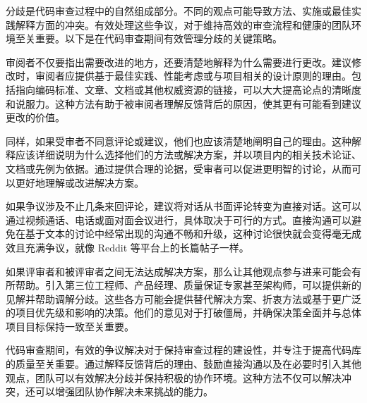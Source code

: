 
分歧是代码审查过程中的自然组成部分。不同的观点可能导致方法、实施或最佳实践解释方面的冲突。有效处理这些争议，对于维持高效的审查流程和健康的团队环境至关重要。以下是在代码审查期间有效管理分歧的关键策略。


审阅者不仅要指出需要改进的地方，还要清楚地解释为什么需要进行更改。建议修改时，审阅者应提供基于最佳实践、性能考虑或与项目相关的设计原则的理由。包括指向编码标准、文章、文档或其他权威资源的链接，可以大大提高论点的清晰度和说服力。这种方法有助于被审阅者理解反馈背后的原因，使其更有可能看到建议更改的价值。


同样，如果受审者不同意评论或建议，他们也应该清楚地阐明自己的理由。这种解释应该详细说明为什么选择他们的方法或解决方案，并以项目内的相关技术论证、文档或先例为依据。通过提供合理的论据，受审者可以促进更明智的讨论，从而可以更好地理解或改进解决方案。


如果争议涉及不止几条来回评论，建议将对话从书面评论转变为直接对话。这可以通过视频通话、电话或面对面会议进行，具体取决于可行的方式。直接沟通可以避免在基于文本的讨论中经常出现的沟通不畅和升级，这种讨论很快就会变得毫无成效且充满争议，就像 Reddit 等平台上的长篇帖子一样。


如果评审者和被评审者之间无法达成解决方案，那么让其他观点参与进来可能会有所帮助。引入第三位工程师、产品经理、质量保证专家甚至架构师，可以提供新的见解并帮助调解分歧。这些各方可能会提供替代解决方案、折衷方法或基于更广泛的项目优先级和影响的决策。他们的意见对于打破僵局，并确保决策全面并与总体项目目标保持一致至关重要。

代码审查期间，有效的争议解决对于保持审查过程的建设性，并专注于提高代码库的质量至关重要。通过解释反馈背后的理由、鼓励直接沟通以及在必要时引入其他观点，团队可以有效解决分歧并保持积极的协作环境。这种方法不仅可以解决冲突，还可以增强团队协作解决未来挑战的能力。
